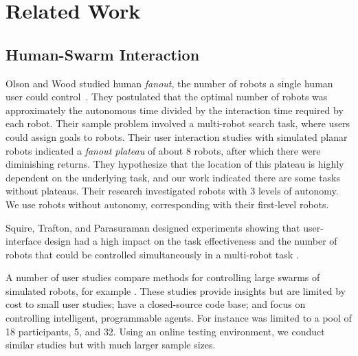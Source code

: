 

\section{Related Work}\label{sec:RelatedWork}


\subsection{Human-Swarm Interaction}
Olson and Wood studied human \emph{fanout}, the number of robots a single human user could control~\cite{Jr2004}.  %
They postulated that the optimal number of robots was approximately  the autonomous time  divided by the interaction time required by each robot.  Their sample problem involved a multi-robot search task, where users could assign goals to robots.  Their user interaction studies with simulated planar robots  indicated a \emph{fanout plateau} of about 8 robots, after which there were diminishing returns.   They hypothesize that the location of this plateau is highly dependent on the underlying task, and our work indicated there are some tasks without plateaus. %
Their research investigated robots with 3 levels of autonomy.  We use robots without autonomy, corresponding with their first-level robots.


Squire, Trafton, and Parasuraman designed experiments showing that user-interface design had a high impact on the task effectiveness and the number of robots that could be controlled simultaneously in a multi-robot task \cite{Squire:2006:HCM:1121241.1121248}.

A number of user studies compare methods for controlling large swarms of simulated robots, for example \cite{bashyal2008human,kolling2012towards,de2012controllability}.  These studies provide insights but are limited by cost to small user studies; have a closed-source code base; and focus on controlling intelligent, programmable agents.  
For instance \cite{de2012controllability} was limited to a pool of 18 participants,  \cite{bashyal2008human} 5, and \cite{kolling2012towards} 32.
	Using an online testing environment, we conduct similar studies but with much larger sample sizes.


